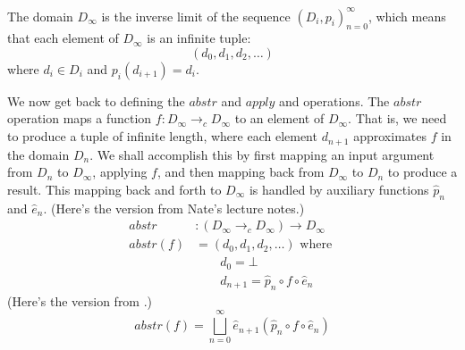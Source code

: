 \documentclass{tufte-handout}
\begin{document}






The domain $D_{\infty}$ is the inverse limit of the sequence
$(D_i,p_i)_{n=0}^\infty$, which means that each element of
$D_{\infty}$ is an infinite tuple:
\[
   (d_0,d_1, d_2, \ldots )
\]
where $d_i \in D_i$ and $p_i(d_{i+1}) = d_i$.

We now get back to defining the $\mathit{abstr}$ and $\mathit{apply}$
and operations. The $\mathit{abstr}$ operation maps a function $f :
D_{\infty} \to_c D_{\infty}$ to an element of $D_\infty$.  That is, we
need to produce a tuple of infinite length, where each element
$d_{n+1}$ approximates $f$ in the domain $D_n$.
%
We shall accomplish this by first mapping an input argument from $D_n$
to $D_\infty$, applying $f$, and then mapping back from $D_\infty$ to
$D_n$ to produce a result. This mapping back and forth to $D_\infty$
is handled by auxiliary functions $\hat{p}_n$ and $\hat{e}_n$.
(Here's the version from Nate's lecture notes.)
\begin{align*}
 \mathit{abstr} &: (D_{\infty} \to_c D_{\infty}) \to D_{\infty}\\
 \mathit{abstr}(f) &= (d_0, d_1, d_2, \ldots)  \text{ where } \\
 & \qquad d_0 = \bot \\
 & \qquad d_{n+1} = \hat{p}_n \circ f \circ \hat{e}_n
\end{align*}
(Here's the version from \citet{Scott:1971aa}.)
\[
 \mathit{abstr}(f) = \bigsqcup_{n=0}^{\infty} \hat{e}_{n+1}(\hat{p}_n \circ f \circ \hat{e}_n)
\]
\end{document}
